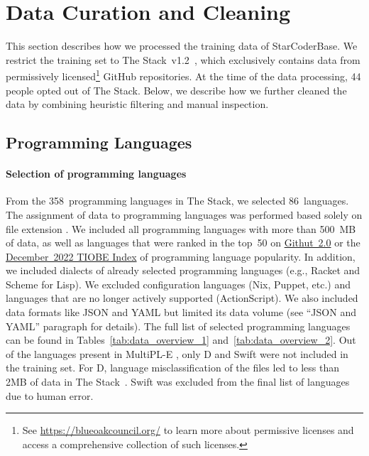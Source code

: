 \documentclass[10pt]{article} %
\begin{document}
\section{Data Curation and Cleaning}\label{sec:data_curation}
This section describes how we processed the training data of StarCoderBase. We restrict the training set to The Stack~v1.2~\citep{Kocetkov2022TheStack}, which exclusively contains data from permissively licensed\footnote{See \url{https://blueoakcouncil.org/} to learn more about permissive licenses and access a comprehensive collection of such licenses. } GitHub repositories. At the time of the data processing, 44 people opted out of The Stack. Below, we describe how we further cleaned the data by combining heuristic filtering and manual inspection.  %

\subsection{Programming Languages} \label{subsec:pls}
\paragraph{Selection of programming languages} From the 358~programming languages in The Stack, we selected 86~languages. The assignment of data to programming languages was performed based solely on file extension \citep{Kocetkov2022TheStack}. We included all programming languages with more than 500~MB of data, as well as languages that were ranked in the top~50 on \href{https://githut.info}{Githut~2.0} or the \href{https://web.archive.org/web/20221229040526/https://www.tiobe.com/tiobe-index/}{December~2022 TIOBE Index} of programming language popularity. In addition, we included dialects of already selected programming languages (e.g., Racket and Scheme for Lisp). We excluded configuration languages (Nix, Puppet, etc.) and languages that are no longer actively supported (ActionScript). We also included data formats like JSON and YAML but limited its data volume (see ``JSON and YAML'' paragraph for details). The full list of selected programming languages can be found in Tables~\ref{tab:data_overview_1} and~\ref{tab:data_overview_2}. 
Out of the languages present in MultiPL-E \citep{cassano2022multiple}, only D and Swift were not included in the training set. For D, language misclassification of the files led to less than 2MB of data in The Stack~\citep{Kocetkov2022TheStack}. Swift was excluded from the final list of languages due to human error.
\end{document}
